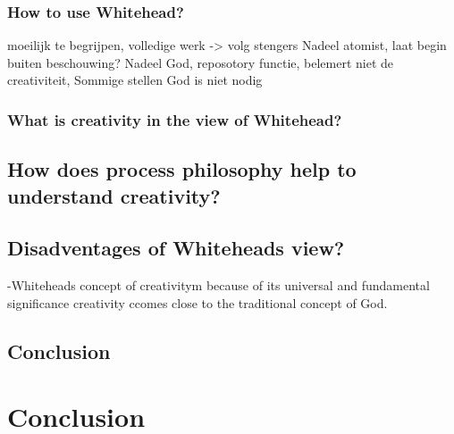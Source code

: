 



\subsubsection{How to use Whitehead?}
	moeilijk te begrijpen, volledige werk -> volg stengers
	Nadeel atomist, laat begin buiten beschouwing?
	Nadeel God, reposotory functie, belemert niet de creativiteit, Sommige stellen God is niet nodig
\subsubsection{What is creativity in the view of Whitehead?}	

\subsection{How does process philosophy help to understand creativity?}
\subsection{Disadventages of Whiteheads view?}
-Whiteheads concept of creativitym because of its universal and fundamental significance creativity ccomes close to the traditional concept of God.

\subsection{Conclusion}

\section{Conclusion}
